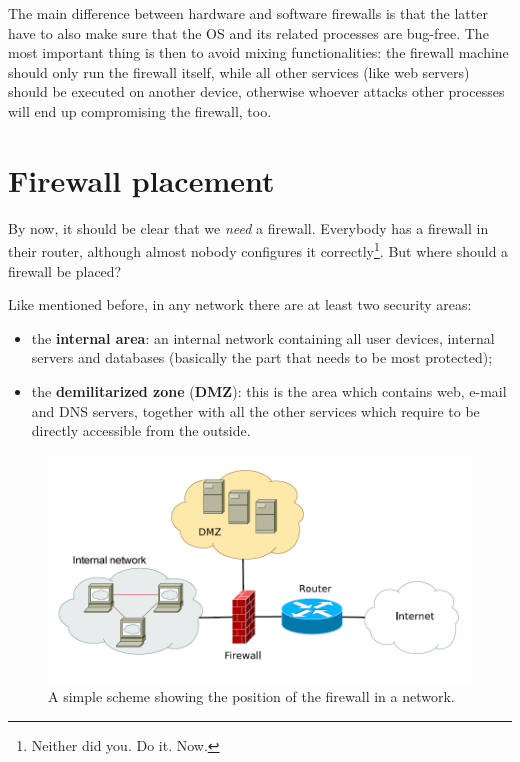 The main difference between hardware and software firewalls is that the latter have to also make sure that the OS and its related processes are bug-free. The most important thing is then to avoid mixing functionalities: the firewall machine should only run the firewall itself, while all other services (like web servers) should be executed on another device, otherwise whoever attacks other processes will end up compromising the firewall, too.


\section{Firewall placement}
By now, it should be clear that we \textit{need} a firewall. Everybody has a firewall in their router, although almost nobody configures it correctly\footnote{Neither did you. Do it. Now.}. But where should a firewall be placed?

Like mentioned before, in any network there are at least two security areas:

\begin{itemize}
    \item the \textbf{internal area}: an internal network containing all user devices, internal servers and databases (basically the part that needs to be most protected);
    \item the \textbf{demilitarized zone} (\textbf{DMZ}): this is the area which contains web, e-mail and DNS servers, together with all the other services which require to be directly accessible from the outside.
\end{itemize}

\begin{figure}[h]
    \centering
    \includegraphics[scale=0.7]{img/fw_placement.png}
    \decoRule
    \caption{A simple scheme showing the position of the firewall in a network.}
    \label{fig:fw_placement}
\end{figure}


